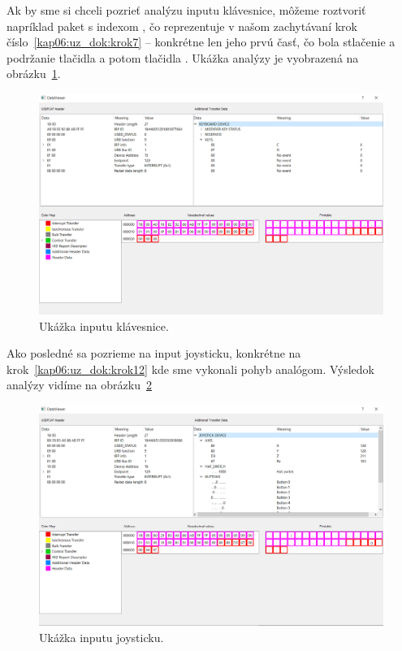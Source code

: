 Ak by sme si chceli pozrieť analýzu inputu klávesnice, môžeme roztvoriť napríklad paket s indexom , čo reprezentuje v našom zachytávaní krok číslo~\ref{kap06:uz_dok:krok7} -- konkrétne len jeho prvú časť, čo bola stlačenie a podržanie tlačidla  a potom tlačidla . Ukážka analýzy je vyobrazená na obrázku~\ref{obr:kap6:uk_input_keyboard}.

\begin{figure}[!htb]
	\centering
	\includegraphics[width=\textwidth]{img/kap06_uk_keyboard}
	\caption{Ukážka inputu klávesnice.}
	\label{obr:kap6:uk_input_keyboard}
\end{figure}

Ako posledné sa pozrieme na input joysticku, konkrétne na krok~\ref{kap06:uz_dok:krok12} kde sme vykonali pohyb analógom. Výsledok analýzy vidíme na obrázku~\ref{obr:kap6:uk_input_joystick}

\begin{figure}[!htb]
	\centering
	\includegraphics[width=\textwidth]{img/kap06_uk_joystick}
	\caption{Ukážka inputu joysticku.}
	\label{obr:kap6:uk_input_joystick}
\end{figure}


